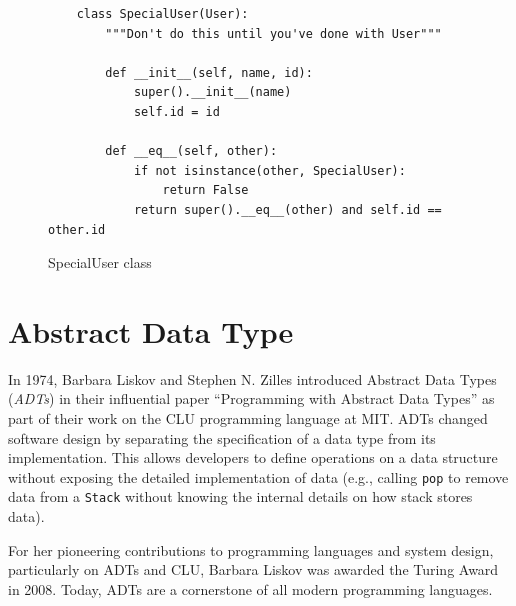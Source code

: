 \documentclass[oneside,11pt,dvipsnames]{book}
\newcommand{\code}[1]{\texttt{#1}}
\begin{document}
\begin{figure}
\begin{lstlisting}
    class SpecialUser(User):
        """Don't do this until you've done with User"""

        def __init__(self, name, id):
            super().__init__(name)
            self.id = id

        def __eq__(self, other):
            if not isinstance(other, SpecialUser):
                return False
            return super().__eq__(other) and self.id == other.id
\end{lstlisting}
\caption{SpecialUser class}\label{ex:specialuser}
\end{figure}




\chapter{Abstract Data Type}\label{chap:adt}


In 1974, Barbara Liskov and Stephen N. Zilles introduced Abstract Data Types (\emph{ADTs}) in their influential paper ``Programming with Abstract Data Types'' as part of their work on the CLU programming language at MIT. ADTs changed software design by separating the specification of a data type from its implementation. This allows developers to define operations on a data structure without exposing the detailed implementation of data (e.g., calling \code{pop} to remove data from a \code{Stack} without knowing the internal details on how stack stores data). 

For her pioneering contributions to programming languages and system design, particularly on ADTs and CLU, Barbara Liskov was awarded the Turing Award in 2008. Today, ADTs are a cornerstone of all modern programming languages.

\end{document}
